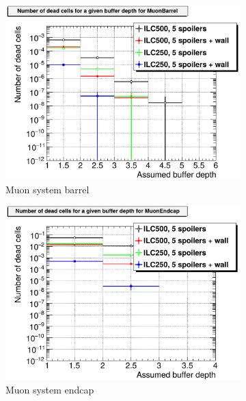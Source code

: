 \begin{figure}[htb]
\begin{subfigure}[b]{0.49\textwidth}
   \centering
    \includegraphics[width=\textwidth]{Figures/BDS_muons/Occupancy_Comparison_All_layers_deadcells_MuonBarrel.png}
   \caption{Muon system barrel}
   \end{subfigure}
   \hfill
    \begin{subfigure}[b]{0.49\textwidth}
   \centering
    \includegraphics[width=\textwidth]{Figures/BDS_muons/Occupancy_Comparison_All_layers_deadcells_MuonEndcap.png}
   \caption{Muon system endcap}
   \end{subfigure}\\
     \begin{subfigure}[b]{0.49\textwidth}
   \centering

\end{subfigure}
\end{figure}
